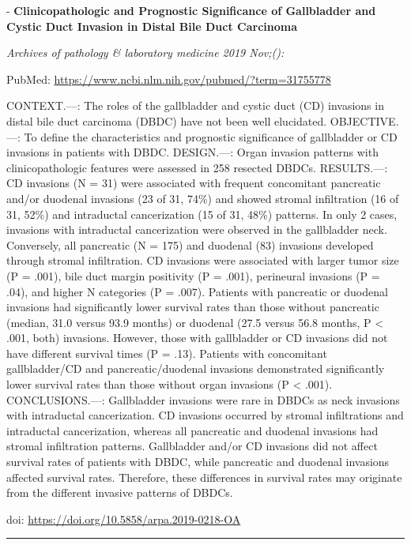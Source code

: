 \documentclass[
]{article}
\begin{document}
- \textbf{Clinicopathologic and Prognostic Significance of Gallbladder
and Cystic Duct Invasion in Distal Bile Duct Carcinoma}

\emph{Archives of pathology \& laboratory medicine 2019 Nov;():}

PubMed: \url{https://www.ncbi.nlm.nih.gov/pubmed/?term=31755778}

CONTEXT.---: The roles of the gallbladder and cystic duct (CD) invasions
in distal bile duct carcinoma (DBDC) have not been well elucidated.
OBJECTIVE.---: To define the characteristics and prognostic significance
of gallbladder or CD invasions in patients with DBDC. DESIGN.---: Organ
invasion patterns with clinicopathologic features were assessed in 258
resected DBDCs. RESULTS.---: CD invasions (N = 31) were associated with
frequent concomitant pancreatic and/or duodenal invasions (23 of 31,
74\%) and showed stromal infiltration (16 of 31, 52\%) and intraductal
cancerization (15 of 31, 48\%) patterns. In only 2 cases, invasions with
intraductal cancerization were observed in the gallbladder neck.
Conversely, all pancreatic (N = 175) and duodenal (83) invasions
developed through stromal infiltration. CD invasions were associated
with larger tumor size (P = .001), bile duct margin positivity (P =
.001), perineural invasions (P = .04), and higher N categories (P =
.007). Patients with pancreatic or duodenal invasions had significantly
lower survival rates than those without pancreatic (median, 31.0 versus
93.9 months) or duodenal (27.5 versus 56.8 months, P \textless{} .001,
both) invasions. However, those with gallbladder or CD invasions did not
have different survival times (P = .13). Patients with concomitant
gallbladder/CD and pancreatic/duodenal invasions demonstrated
significantly lower survival rates than those without organ invasions (P
\textless{} .001). CONCLUSIONS.---: Gallbladder invasions were rare in
DBDCs as neck invasions with intraductal cancerization. CD invasions
occurred by stromal infiltrations and intraductal cancerization, whereas
all pancreatic and duodenal invasions had stromal infiltration patterns.
Gallbladder and/or CD invasions did not affect survival rates of
patients with DBDC, while pancreatic and duodenal invasions affected
survival rates. Therefore, these differences in survival rates may
originate from the different invasive patterns of DBDCs.

doi: \url{https://doi.org/10.5858/arpa.2019-0218-OA}

\begin{center}\rule{0.5\linewidth}{0.5pt}\end{center}
\end{document}
